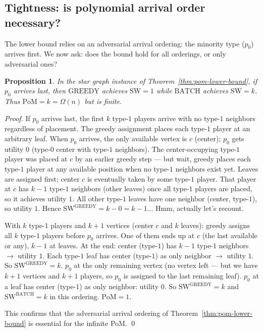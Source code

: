 \documentclass[11pt]{article}
\newtheorem{proposition}[theorem]{Proposition}
\newcommand{\SW}{\mathrm{SW}}
\newcommand{\GREEDY}{\mathrm{GREEDY}}
\newcommand{\BATCH}{\mathrm{BATCH}}
\newcommand{\PoM}{\mathrm{PoM}}
\begin{document}
\subsection{Tightness: is polynomial arrival order necessary?}

The lower bound relies on an adversarial arrival ordering: the minority type ($p_0$)
arrives first.
We now ask: does the bound hold for all orderings, or only adversarial ones?

\begin{proposition}
  \label{prop:arrival-order}
  In the star graph instance of Theorem~\ref{thm:pom-lower-bound}, if $p_0$ arrives
  \emph{last}, then $\GREEDY$ achieves $\SW = 1$ while $\BATCH$ achieves $\SW = k$.
  Thus $\PoM = k = \Omega(n)$ but is finite.
\end{proposition}

\begin{proof}
  If $p_0$ arrives last, the first $k$ type-$1$ players arrive with no type-$1$
  neighbors regardless of placement.
  The greedy assignment places each type-$1$ player at an arbitrary leaf.
  When $p_0$ arrives, the only available vertex is $c$ (center); $p_0$ gets utility
  $0$ (type-$0$ center with type-$1$ neighbors).
  The center-occupying type-$1$ player was placed at $c$ by an earlier greedy step
  --- but wait, greedy places each type-$1$ player at any available position when no
  type-$1$ neighbors exist yet.
  Leaves are assigned first; center $c$ is eventually taken by some type-$1$ player.
  That player at $c$ has $k-1$ type-$1$ neighbors (other leaves) once all type-$1$
  players are placed, so it achieves utility $1$.
  All other type-$1$ leaves have one neighbor (center, type-$1$), so utility $1$.
  Hence $\SW^{\GREEDY} = k - 0 = k - 1$... Hmm, actually let's recount.

  With $k$ type-$1$ players and $k+1$ vertices (center $c$ and $k$ leaves):
  greedy assigns all $k$ type-$1$ players before $p_0$ arrives.
  One of them ends up at $c$ (the last available or any), $k-1$ at leaves.
  At the end: center (type-$1$) has $k-1$ type-$1$ neighbors $\to$ utility $1$.
  Each type-$1$ leaf has center (type-$1$) as only neighbor $\to$ utility $1$.
  So $\SW^{\GREEDY} = k$.
  $p_0$ at the only remaining vertex (no vertex left --- but we have $k+1$ vertices
  and $k+1$ players, so $p_0$ is assigned to the last remaining leaf).
  $p_0$ at a leaf has center (type-$1$) as only neighbor: utility $0$.
  So $\SW^{\GREEDY} = k$ and $\SW^{\BATCH} = k$ in this ordering.
  $\PoM = 1$.

  This confirms that the adversarial arrival ordering of Theorem~\ref{thm:pom-lower-bound}
  is essential for the infinite PoM. \qed
\end{proof}
\end{document}
